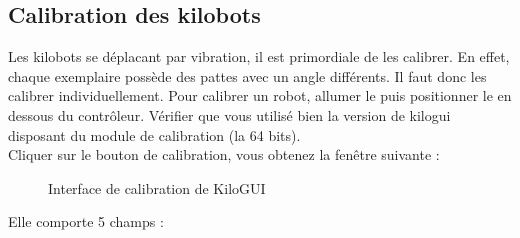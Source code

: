 \documentclass[a4paper,8pt]{report}
\begin{document}
\begin{center}
\end{center}

\subsection*{Calibration des kilobots}\label{sec:name}

Les kilobots se déplacant par vibration, il est primordiale de les calibrer. En effet, chaque exemplaire possède des pattes avec un angle différents. Il faut donc les calibrer individuellement.
Pour calibrer un robot, allumer le puis positionner le en dessous du contrôleur. Vérifier que vous utilisé bien la version de kilogui disposant du module de calibration (la 64 bits).\\
Cliquer sur le bouton de calibration, vous obtenez la fenêtre suivante :

\begin{figure}[!h]
    \centering
    \caption{Interface de calibration de KiloGUI}
\end{figure}

Elle comporte 5 champs :
\end{document}
